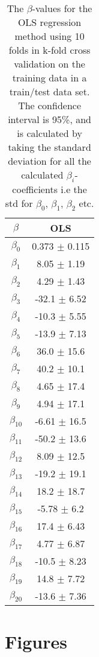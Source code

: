 \documentclass[uio,jmp,amsmath,amssymb,reprint,nofootinbib]{revtex4-1}
\numberwithin{equation}{section}
\begin{document}
\begin{table}
\begin{tabular}{|c|c|}\hline
\(\beta\) & OLS \\ \hline
\(\beta_{0}\) & 0.373 \(\pm\) 0.115 \\ \hline
\(\beta_{1}\) & 8.05 \(\pm\) 1.19 \\ \hline
\(\beta_{2}\) & 4.29 \(\pm\) 1.43 \\ \hline
\(\beta_{3}\) & -32.1 \(\pm\) 6.52 \\ \hline
\(\beta_{4}\) & -10.3 \(\pm\) 5.55 \\ \hline
\(\beta_{5}\) & -13.9 \(\pm\) 7.13 \\ \hline
\(\beta_{6}\) & 36.0 \(\pm\) 15.6 \\ \hline
\(\beta_{7}\) & 40.2 \(\pm\) 10.1 \\ \hline
\(\beta_{8}\) & 4.65 \(\pm\) 17.4 \\ \hline
\(\beta_{9}\) & 4.94 \(\pm\) 17.1 \\ \hline
\(\beta_{10}\) & -6.61 \(\pm\) 16.5 \\ \hline
\(\beta_{11}\) & -50.2 \(\pm\) 13.6 \\ \hline
\(\beta_{12}\) & 8.09 \(\pm\) 12.5 \\ \hline
\(\beta_{13}\) & -19.2 \(\pm\) 19.1 \\ \hline
\(\beta_{14}\) & 18.2 \(\pm\) 18.7 \\ \hline
\(\beta_{15}\) & -5.78 \(\pm\) 6.2 \\ \hline
\(\beta_{16}\) & 17.4 \(\pm\) 6.43 \\ \hline
\(\beta_{17}\) & 4.77 \(\pm\) 6.87 \\ \hline
\(\beta_{18}\) & -10.5 \(\pm\) 8.23 \\ \hline
\(\beta_{19}\) & 14.8 \(\pm\) 7.72 \\ \hline
\(\beta_{20}\) & -13.6 \(\pm\) 7.36 \\ \hline
\end{tabular}
\caption{The \(\beta\)-values for the OLS regression method using 10 folds in k-fold cross validation on the training data in a train/test data set. The confidence interval is 95\%, and is calculated by taking the standard deviation for all the calculated \(\beta_i\)-coefficients i.e the std for \(\beta_0\), \(\beta_1\), \(\beta_2\) etc.}
\label{tab:06}
\end{table}

\section{Figures}
\end{document}
